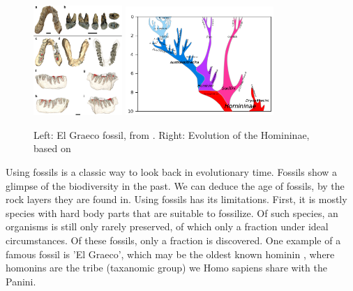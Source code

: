 \begin{figure}[H]
  \includegraphics[width=0.3\textwidth]{Graecopithecus.jpg}
  \includegraphics[width=0.5\textwidth]{Hominini_lineage.png}
  \caption{
    Left: El Graeco fossil, from \cite{fuss2017potential}.
    Right: Evolution of the Homininae, based on \cite{stringer2012makes}
 }
  \label{fig:human_evolution}
\end{figure}

Using fossils is a classic way to look back in evolutionary time.
Fossils show a glimpse of the biodiversity in the past.
We can deduce the age of fossils, by the rock layers they are found in.
Using fossils has its limitations. First, it is mostly species with hard body
parts that are suitable to fossilize. Of such species, an organisms is still 
only rarely preserved, of which only a fraction under ideal circumstances. Of 
these fossils, only a fraction is discovered.
One example of a famous fossil is 'El Graeco', 
which may be the oldest known hominin \cite{fuss2017potential}, where
homonins are the tribe (taxanomic group) we Homo sapiens share with the Panini.




